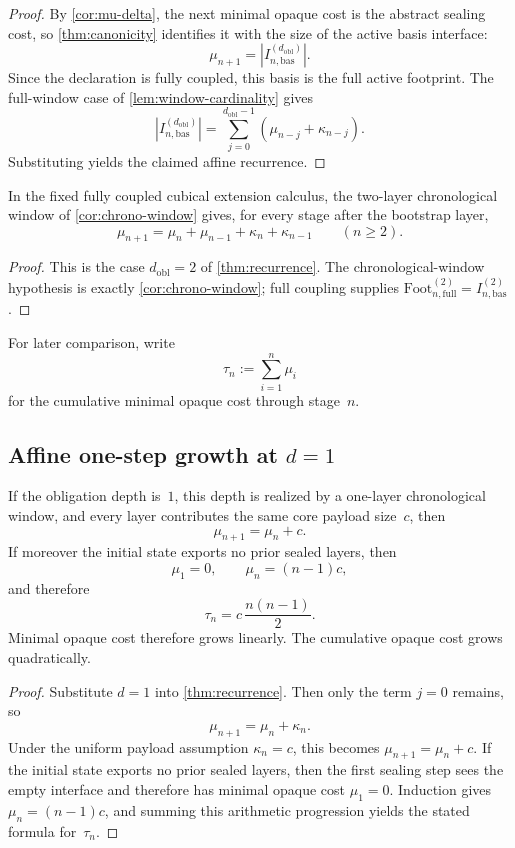 \documentclass{lmcs}
\newcommand{\Foot}{\mathrm{Foot}}
\begin{document}
\begin{proof}
By \autoref{cor:mu-delta}, the next minimal opaque cost is the abstract sealing cost, so \autoref{thm:canonicity} identifies it with the size of the active basis interface:
\[
  \mu_{n+1} = |I_{n,\mathrm{bas}}^{(d_{\mathrm{obl}})}|.
\]
Since the declaration is fully coupled, this basis is the full active
footprint. The full-window case of \autoref{lem:window-cardinality} gives
\[
  |I_{n,\mathrm{bas}}^{(d_{\mathrm{obl}})}|
  =
  \sum_{j=0}^{d_{\mathrm{obl}}-1}(\mu_{n-j}+\kappa_{n-j}).
\]
Substituting yields the claimed affine recurrence.
\end{proof}

\begin{cor}
\label{cor:depth-two-window-recurrence}
In the fixed fully coupled cubical extension calculus, the two-layer chronological window of \autoref{cor:chrono-window} gives, for every stage after the bootstrap layer,
\[
  \mu_{n+1}
  =
  \mu_n+\mu_{n-1}+\kappa_n+\kappa_{n-1}
  \qquad (n\geq2).
\]
\end{cor}

\begin{proof}
This is the case $d_{\mathrm{obl}}=2$ of \autoref{thm:recurrence}. The chronological-window hypothesis is exactly \autoref{cor:chrono-window}; full coupling supplies $\Foot_{n,\mathrm{full}}^{(2)}=I_{n,\mathrm{bas}}^{(2)}$.
\end{proof}

For later comparison, write
\[
  \tau_n := \sum_{i=1}^n \mu_i
\]
for the cumulative minimal opaque cost through stage~$n$.

\subsection{\texorpdfstring{Affine one-step growth at $d=1$}{Affine one-step growth at d=1}}

\begin{cor}
\label{cor:d1}
If the obligation depth is~$1$, this depth is realized by a one-layer chronological window, and every layer contributes the same core payload size~$c$, then
\[
  \mu_{n+1} = \mu_n + c.
\]
If moreover the initial state exports no prior sealed layers, then
\[
  \mu_1 = 0,
  \qquad
  \mu_n = (n-1)c,
\]
and therefore
\[
  \tau_n = c\,\frac{n(n-1)}{2}.
\]
Minimal opaque cost therefore grows linearly. The cumulative opaque cost grows quadratically.
\end{cor}

\begin{proof}
Substitute $d=1$ into \autoref{thm:recurrence}. Then only the term $j=0$ remains, so
\[
  \mu_{n+1} = \mu_n + \kappa_n.
\]
Under the uniform payload assumption $\kappa_n=c$, this becomes $\mu_{n+1}=\mu_n+c$. If the initial state exports no prior sealed layers, then the first sealing step sees the empty interface and therefore has minimal opaque cost $\mu_1=0$. Induction gives $\mu_n=(n-1)c$, and summing this arithmetic progression yields the stated formula for~$\tau_n$.
\end{proof}
\end{document}
